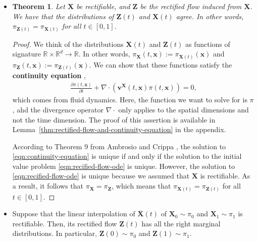 \documentclass[10pt]{article}
\newtheorem{theorem}[lemma]{Theorem}
\newcommand{\ve}[1]{\mathbf{#1}}
\newcommand{\Real}{\mathbb{R}}
\begin{document}
\begin{itemize}
  \item \begin{theorem}
    Let $\ve{X}$ be rectifiable, and $\ve{Z}$ be the rectified flow induced from $\ve{X}$. We have that the distributions of $\ve{Z}(t)$ and $\ve{X}(t)$ agree. In other words, $\pi_{\ve{Z}(t)} = \pi_{\ve{X}(t)}$ for all $t \in [0,1]$.
  \end{theorem}

  \begin{proof}
    We think of the distributions $\ve{X}(t)$ and $\ve{Z}(t)$ as functions of signature $\Real \times \Real^d \rightarrow \Real$. In other words, $\pi_{\ve{X}}(t, \ve{x}) := \pi_{\ve{X}(t)}(\ve{x})$ and $\pi_{\ve{Z}}(t, \ve{x}) := \pi_{\ve{Z}(t)}(\ve{x}).$ We can show that these functions satisfy the {\bf continuity equation} \cite{ContinuityEquation},
    \begin{align}
      \frac{\partial \pi(t,\ve{x})}{\partial t} + \nabla \cdot (\ve{v}^{\ve{X}}(t, \ve{x}) \pi(t, \ve{x})) = 0, \label{eqn:continuity-equation}
    \end{align}
    which comes from fluid dynamics. Here, the function we want to solve for is $\pi$, ahd the divergence operator $\nabla \cdot$ only applies to the spatial dimensions and not the time dimension. The proof of this assertion is available in Lemma~\ref{thm:rectified-flow-and-continuity-equation} in the appendix.
    
    According to Theorem 9 from Ambrosio and Crippa \cite{Ambrosio:2006}, the solution to \eqref{eqn:continuity-equation} is unique if and only if the solution to the initial value problem \eqref{eqn:recified-flow-ode} is unique. However, the solution to \eqref{eqn:recified-flow-ode} is unique because we assumed that $\ve{X}$ is rectifiable. As a result, it follows that $\pi_{\ve{X}} = \pi_{\ve{Z}}$, which means that $\pi_{\ve{X}(t)} = \pi_{\ve{Z}(t)}$ for all $t \in [0,1]$.
  \end{proof}

  \item Suppose that the linear interpolation of $\overline{\ve{X}}(t)$ of $\ve{X}_0 \sim \pi_0$ and $\ve{X}_1 \sim \pi_1$ is rectifiable. Then, its rectified flow $\ve{Z}(t)$ has all the right marginal distributions. In particular, $\ve{Z}(0) \sim \pi_0$ and $\ve{Z}(1) \sim \pi_1$.
  

\end{itemize}
\end{document}
